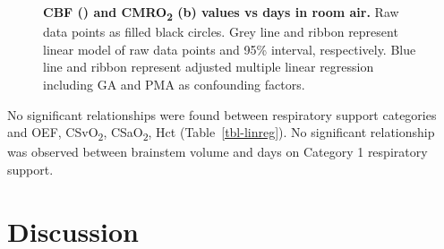 \documentclass[
  letterpaper,
  DIV=11,
  numbers=noendperiod]{scrartcl}
\begin{document}
\begin{figure}


\caption{\label{fig-roomair}\textbf{CBF () and CMRO\textsubscript{2} (b)
values vs days in room air.} Raw data points as filled black circles.
Grey line and ribbon represent linear model of raw data points and 95\%
interval, respectively. Blue line and ribbon represent adjusted multiple
linear regression including GA and PMA as confounding factors.}

\end{figure}%

No significant relationships were found between respiratory support
categories and OEF, CSvO\textsubscript{2}, CSaO\textsubscript{2}, Hct
(Table~\ref{tbl-linreg}). No significant relationship was observed
between brainstem volume and days on Category 1 respiratory support.

\section{Discussion}\label{discussion}
\end{document}
